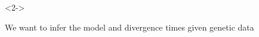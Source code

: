 \begin{frame}

    \begin{minipage}[t][0.1\textheight][t]{\linewidth}
        \begin{onlyenv}<2->
            \begin{center}
                We want to infer the model and divergence times given genetic data
            \end{center}
        \end{onlyenv}

    \end{minipage}
\end{frame}


% 




